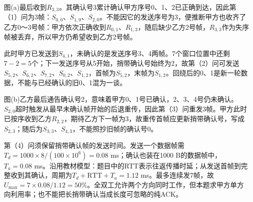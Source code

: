 \documentclass{sidenotes-simplex}
\begin{document}
图(a)最后收到\(R_{3,3}\)。其确认号3累计确认甲方序号0、1、2已正确到达，因此第（1）问为3帧：\(S_{0,0}\)、\(S_{1,0}\)、\(S_{2,0}\)。不能因它的发送序号为3，便推断甲方也收齐了乙方0～3号帧：甲方依次正确收到\(R_{0,1}\)、\(R_{1,3}\)，随后缺少乙方2号帧，\(R_{3,3}\)作为失序帧被丢弃，所以甲方仍希望收到乙方2号帧。

此时甲方已发送到\(S_{4,1}\)，未确认的是发送序号3、4两帧。7个窗口位置中还剩\(7-2=5\)个；下一发送序号从5开始，捎带确认号始终为2，故第（2）问可发送\(S_{5,2}\)、\(S_{6,2}\)、\(S_{7,2}\)、\(S_{0,2}\)、\(S_{1,2}\)，首帧为\(S_{5,2}\)，末帧为\(S_{1,2}\)。回绕后的0、1是新一轮数据，不能与已经确认的旧0、1混为一谈。

图(b)乙方最后通告确认号2，意味着甲方0、1号已确认，2、3、4号仍未确认。\(S_{2,0}\)超时触发从最早未确认帧开始的后退重传，因此第（3）问重发3帧。甲方此时已按序收到乙方\(R_{2,2}\)，期待乙方下一帧为3，故重传首帧应更新捎带确认号，写成\(S_{2,3}\)；随后为\(S_{3,3}\)、\(S_{4,3}\)，不能照抄旧帧的确认号0。

第（4）问须保留捎带确认帧的发送时间。发送一个数据帧需\(T_d=1000\times8/(100\times10^6)=0.08\) ms；确认也装在1000 B的数据帧中，\(T_a=0.08\) ms。沿用教材模型：题目中的RTT表示往返传播时延；从发送首帧到完整收到其确认，周期为\(T_d+\mathrm{RTT}+T_a=1.12\) ms。最多连续发7帧，故\(U_{\max}=7\times0.08/1.12=50\%\)。全双工允许两个方向同时工作，但本题求甲方单方向利用率；也不能把长捎带确认当成长度可忽略的纯ACK。
\end{document}
